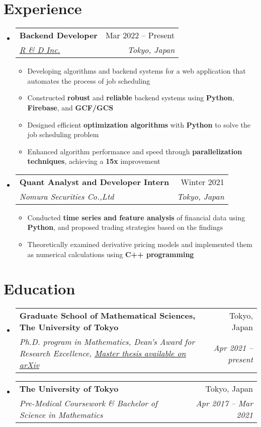 \documentclass[a4paper,11pt]{article}
\makeatletter
\newcommand{\resumeItem}[1]{
  \item\small{#1}
}
\newcommand{\resumeItemListStart}{\begin{itemize}[rightmargin=0.11in]}
\newcommand{\resumeItemListEnd}{\end{itemize}}
\newcommand{\resumeQuadHeading}[4]{
  \item
  \begin{tabular*}{0.96\textwidth}[t]{l@{\extracolsep{\fill}}r}
    \textbf{#1} & #2 \\
    \textit{\small#3} & \textit{\small #4} \\
  \end{tabular*}
}
\newcommand{\resumeHeadingListStart}{
  \begin{itemize}[leftmargin=0.15in, label={}]
}
\newcommand{\resumeHeadingListEnd}{\end{itemize}}
\makeatother
\begin{document}

\section{Experience}
\resumeHeadingListStart{}
\resumeQuadHeading{Backend Developer}{Mar 2022 -- Present}
{\href{https://randd-inc.com/}{\uline{R \& D Inc.}}}{Tokyo, Japan}
\resumeItemListStart{}
\resumeItem{Developing algorithms and backend systems for a web application that automates the process of job scheduling}
\resumeItem{Constructed \textbf{robust} and \textbf{reliable} backend systems using \textbf{Python}, \textbf{Firebase}, and \textbf{GCF/GCS}}
\resumeItem{Designed efficient \textbf{optimization algorithms} with \textbf{Python} to solve the job scheduling problem}
\resumeItem{Enhanced algorithm performance and speed through \textbf{parallelization techniques}, achieving a \textbf{15x} improvement}
\resumeItemListEnd{}

\resumeQuadHeading{Quant Analyst and Developer Intern}{Winter 2021}
{Nomura Securities Co.,Ltd}{Tokyo, Japan}
\resumeItemListStart{}
\resumeItem{Conducted \textbf{time series and feature analysis} of financial data using \textbf{Python}, and proposed trading strategies based on the findings}
\resumeItem{Theoretically examined derivative pricing models and implemented them as numerical calculations using \textbf{C++ programming}}
\resumeItemListEnd{}

\resumeHeadingListEnd{}



\section{Education}
\resumeHeadingListStart{}
\resumeQuadHeading{Graduate School of Mathematical Sciences,
    The University of Tokyo}{Tokyo, Japan}
{Ph.D. program in Mathematics, Dean's Award for Research Excellence, \href{https://arxiv.org/abs/2302.12501}{\uline{Master thesis available on arXiv}}}{Apr 2021 -- present}
\resumeQuadHeading{The University of Tokyo}{Tokyo, Japan}
{Pre-Medical Coursework \& Bachelor of Science in Mathematics}{Apr 2017 -- Mar 2021}
\resumeHeadingListEnd{}
\end{document}
